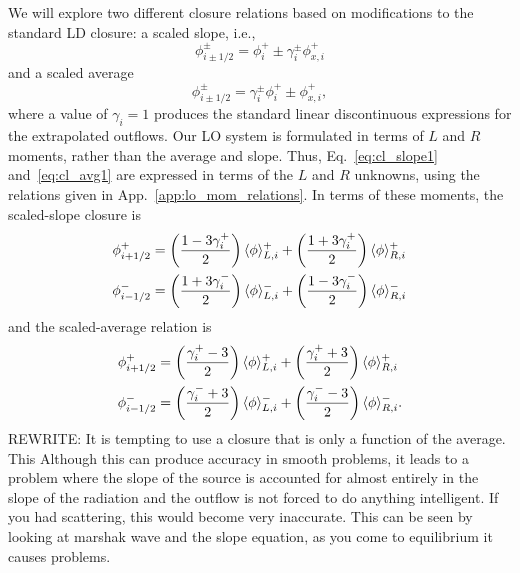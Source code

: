 We will
explore two different closure relations based on modifications to the standard LD closure: a scaled slope, i.e.,
\begin{equation}\label{eq:cl_slope1}
    \phi_{i\pm1/2}^\pm = \phi_i^+ \pm \gamma_i^{\pm} \phi_{x,i}^+
\end{equation}
and a scaled average
\begin{equation}\label{eq:cl_avg1}
    \phi_{i\pm1/2}^\pm = \gamma_i^{\pm} \phi_i^+ \pm \phi_{x,i}^+,
\end{equation}
where a value of $\gamma_i = 1$ produces the standard linear discontinuous expressions for
the extrapolated outflows.  Our LO system is formulated in terms of $L$ and $R$ moments, rather than the average and
slope.  Thus, Eq.~\eqref{eq:cl_slope1} and~\eqref{eq:cl_avg1} are expressed in terms of the $L$ and $R$
unknowns, using the relations given in App.~\ref{app:lo_mom_relations}.  In terms of these
moments, the scaled-slope closure is
\begin{align}\label{eq:cl_slope}
    \phi_{i+1/2}^+  &= \left(\frac{\displaystyle 1 - 3 \gamma_i^+}{\displaystyle 2 }  \right)
    \langle \phi \rangle_{L,i}^+ + \left(\frac{\displaystyle 1 + 3 \gamma_i^+}{\displaystyle 2 }  \right)
    \langle \phi \rangle_{R,i}^+ \\
    \phi_{i-1/2}^-  &= \left(\frac{\displaystyle 1 + 3 \gamma_i^-}{\displaystyle 2 }  \right)
    \langle \phi \rangle_{L,i}^- + \left(\frac{\displaystyle 1 - 3 \gamma_i^-}{\displaystyle 2 }  \right)
    \langle \phi \rangle_{R,i}^- 
\end{align}
and the scaled-average relation is
\begin{align}\label{eq:cl_avg}
    \phi_{i+1/2}^+  &= \left(\frac{\displaystyle  \gamma_i^+ - 3}{\displaystyle 2 }  \right)
    \langle \phi \rangle_{L,i}^+ + \left(\frac{\displaystyle \gamma_i^+ + 3}{\displaystyle 2 }  \right)
    \langle \phi \rangle_{R,i}^+ \\
    \phi_{i-1/2}^-  &= \left(\frac{\displaystyle \gamma_i^- + 3}{\displaystyle 2 }  \right)
    \langle \phi \rangle_{L,i}^- + \left(\frac{\displaystyle \gamma_i^- - 3}{\displaystyle 2 }  \right)
    \langle \phi \rangle_{R,i}^- .
\end{align}
REWRITE:  It is tempting to use a closure that is only a function of the average.  This
Although this can produce accuracy in smooth problems, it leads to a problem where the
slope of the source is accounted for almost entirely in the slope of the radiation and the
outflow is not forced to do anything intelligent. If you had scattering, this would become
very inaccurate.  This can be seen by looking at marshak wave and the slope equation, as
you come to equilibrium it causes problems.


